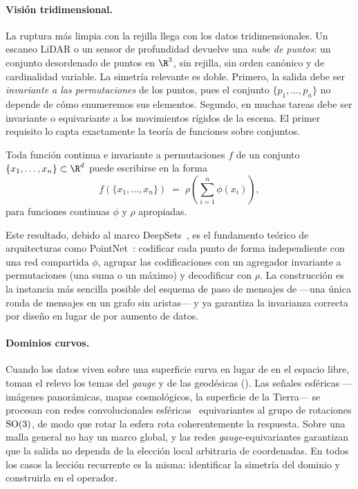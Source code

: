 \paragraph{Visi\'on tridimensional.}
La ruptura m\'as limpia con la rejilla llega con los datos tridimensionales. Un
escaneo LiDAR o un sensor de profundidad devuelve una \emph{nube de puntos}: un
conjunto desordenado de puntos en $\R^3$, sin rejilla, sin orden can\'onico y de
cardinalidad variable. La simetr\'ia relevante es doble. Primero, la salida debe
ser \emph{invariante a las permutaciones} de los puntos, pues el conjunto
$\{p_1,\dots,p_n\}$ no depende de c\'omo enumeremos sus elementos. Segundo, en
muchas tareas debe ser invariante o equivariante a los movimientos r\'igidos de
la escena. El primer requisito lo capta exactamente la teor\'ia de funciones
sobre conjuntos.

\begin{theorem}
\label{thm:apps:deepsets}
Toda funci\'on continua e invariante a permutaciones $f$ de un conjunto
$\{x_1,\dots,x_n\}\subset\R^d$ puede escribirse en la forma
\[
  f(\{x_1,\dots,x_n\}) \;=\; \rho\!\left(\sum_{i=1}^n \phi(x_i)\right),
\]
para funciones continuas $\phi$ y $\rho$ apropiadas.
\end{theorem}

Este resultado, debido al marco DeepSets~\citep{zaheer2017deepsets}, es el
fundamento te\'orico de arquitecturas como PointNet~\citep{qi2017pointnet}:
codificar cada punto de forma independiente con una red compartida $\phi$,
agrupar las codificaciones con un agregador invariante a permutaciones (una suma
o un m\'aximo) y decodificar con $\rho$. La construcci\'on es la instancia m\'as
sencilla posible del esquema de paso de mensajes de  ---una
\'unica ronda de mensajes en un grafo sin aristas--- y ya garantiza la
invarianza correcta por dise\~no en lugar de por aumento de datos.

\paragraph{Dominios curvos.}
Cuando los datos viven sobre una superficie curva en lugar de en el espacio
libre, toman el relevo los temas del \emph{gauge} y de las geod\'esicas
(). Las se\~nales esf\'ericas ---im\'agenes
panor\'amicas, mapas cosmol\'ogicos, la superficie de la Tierra--- se procesan
con redes convolucionales esf\'ericas~\citep{cohen2018sphericalcnns}
equivariantes al grupo de rotaciones $\mathrm{SO}(3)$, de modo que rotar la esfera rota
coherentemente la respuesta. Sobre una malla general no hay un marco global, y
las redes \emph{gauge}-equivariantes garantizan que la salida no dependa de la
elecci\'on local arbitraria de coordenadas. En todos los casos la lecci\'on
recurrente es la misma: identificar la simetr\'ia del dominio y construirla en el
operador.

